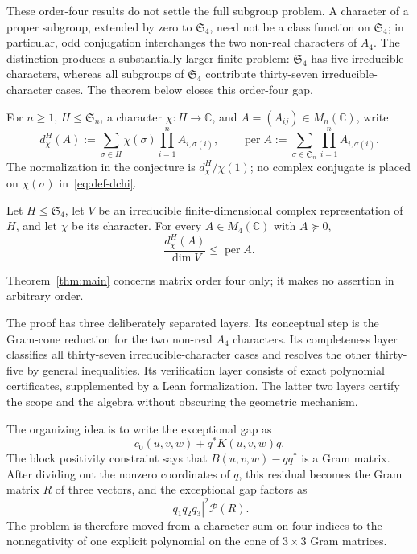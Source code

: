\documentclass[10pt,twoside]{siamart1116}
\newcommand{\CC}{\mathbb C}
\newcommand{\Sn}{\mathfrak S}
\newcommand{\per}{\operatorname{per}}
\newcommand{\psd}{\succeq 0}
\begin{document}
These order-four results do not settle the full subgroup problem.  A
character of a proper subgroup, extended by zero to $\Sn_4$, need not be a
class function on $\Sn_4$; in particular, odd conjugation interchanges the
two non-real characters of $A_4$.  The distinction produces a substantially
larger finite problem: $\Sn_4$ has five irreducible characters, whereas all
subgroups of $\Sn_4$ contribute thirty-seven irreducible-character cases.
The theorem below closes this order-four gap.

For $n\geq1$, $H\leq\Sn_n$, a character $\chi:H\to\CC$, and
$A=(A_{ij})\in M_n(\CC)$, write
\begin{equation}\label{eq:def-dchi}
 d_\chi^H(A):=\sum_{\sigma\in H}\chi(\sigma)
   \prod_{i=1}^n A_{i,\sigma(i)},
 \qquad
 \per A:=\sum_{\sigma\in\Sn_n}\prod_{i=1}^n A_{i,\sigma(i)}.
\end{equation}
The normalization in the conjecture is $d_\chi^H/\chi(1)$; no complex
conjugate is placed on $\chi(\sigma)$ in~\eqref{eq:def-dchi}.

\begin{theorem}\label{thm:main}
Let $H\leq\Sn_4$, let $V$ be an irreducible finite-dimensional complex
representation of $H$, and let $\chi$ be its character.  For every
$A\in M_4(\CC)$ with $A\psd$,
\begin{equation}\label{eq:main}
  \frac{d_\chi^H(A)}{\dim V}\leq \per A.
\end{equation}
\end{theorem}

Theorem~\ref{thm:main} concerns matrix order four only; it makes no assertion
in arbitrary order.

The proof has three deliberately separated layers.  Its conceptual step is
the Gram-cone reduction for the two non-real $A_4$ characters.  Its
completeness layer classifies all thirty-seven irreducible-character cases
and resolves the other thirty-five by general inequalities.  Its
verification layer consists of exact polynomial certificates, supplemented
by a Lean formalization.  The latter two layers certify the scope and the
algebra without obscuring the geometric mechanism.

The organizing idea is to write the exceptional gap as
\[
 c_0(u,v,w)+q^*K(u,v,w)q.
\]
The block positivity constraint says that $B(u,v,w)-qq^*$ is a Gram matrix.
After dividing out the nonzero coordinates of $q$, this residual becomes the
Gram matrix $R$ of three vectors, and the exceptional gap factors as
\[
 |q_1q_2q_3|^2\mathcal P(R).
\]
The problem is therefore moved from a character sum on four indices to the
nonnegativity of one explicit polynomial on the cone of $3\times3$ Gram
matrices.
\end{document}
